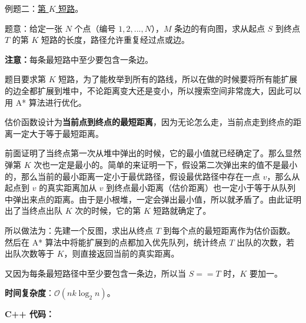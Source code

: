 例题二：\href{http://poj.org/problem?id=2449}{第 $K$ 短路}。

题意：给定一张 $N$ 个点（编号 $1,2,...,N$），$M$ 条边的有向图，求从起点 $S$ 到终点 $T$ 的第 $K$ 短路的长度，路径允许重复经过点或边。

\textbf{注意：}每条最短路中至少要包含一条边。

题目要求第 $K$ 短路，为了能枚举到所有的路线，所以在做的时候要将所有能扩展的边全都扩展到堆中，不论距离变大还是变小，所以搜索空间非常庞大，因此可以用 A* 算法进行优化。

估价函数设计为\textbf{当前点到终点的最短距离}，因为无论怎么走，当前点走到终点的距离一定大于等于最短距离。

前面证明了当终点第一次从堆中弹出的时候，它的最小值就已经确定了。那么显然弹第 $K$ 次也一定是最小的。简单的来证明一下，假设第二次弹出来的值不是最小的，那么当前的最小距离一定小于最优路径，假设最优路径中存在一点 $v$，那么从起点到 $v$ 的真实距离加从 $v$ 到终点最小距离（估价距离）也一定小于等于从队列中弹出来点的距离。由于是小根堆，一定会弹出最小值，所以就矛盾了。由此证明出了当终点出队 $K$ 次的时候，它的第 $K$ 短路就确定了。

所以做法为：先建一个反图，求出从终点 $T$ 到每个点的最短距离作为估价函数。然后在 A* 算法中将能扩展到的点都加入优先队列，统计终点 $T$ 出队的次数，若出队次数等于 $K$，则直接返回当前的真实距离。

又因为每条最短路径中至少要包含一条边，所以当 $S == T$ 时，$K$ 要加一。

\textbf{时间复杂度}：$\mathcal{O}(nk \log_2 n)$。

\textbf{C++ 代码：}

